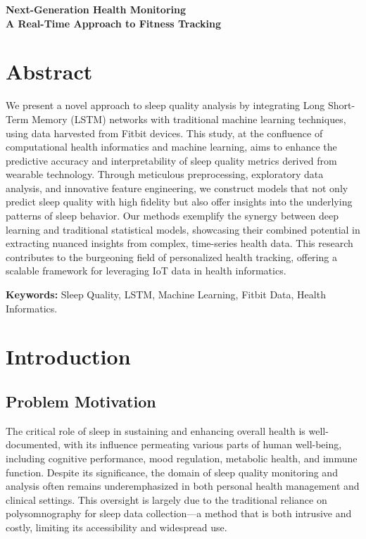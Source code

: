 \documentclass[10pt]{extarticle}
\begin{document}
\begin{center}
    {\LARGE \textbf{Next-Generation Health Monitoring}} \\
    {\large \textbf{A Real-Time Approach to Fitness Tracking}}
\end{center}

\section{Abstract}

We present a novel approach to sleep quality analysis by integrating Long Short-Term Memory (LSTM) networks with traditional machine learning techniques, using data harvested from Fitbit devices. This study, at the confluence of computational health informatics and machine learning, aims to enhance the predictive accuracy and interpretability of sleep quality metrics derived from wearable technology. Through meticulous preprocessing, exploratory data analysis, and innovative feature engineering, we construct models that not only predict sleep quality with high fidelity but also offer insights into the underlying patterns of sleep behavior. Our methods exemplify the synergy between deep learning and traditional statistical models, showcasing their combined potential in extracting nuanced insights from complex, time-series health data. This research contributes to the burgeoning field of personalized health tracking, offering a scalable framework for leveraging IoT data in health informatics.

\textbf{Keywords:} Sleep Quality, LSTM, Machine Learning, Fitbit Data, Health Informatics.

\section{Introduction}

\subsection{Problem Motivation}

The critical role of sleep in sustaining and enhancing overall health is well-documented, with its influence permeating various parts of human well-being, including cognitive performance, mood regulation, metabolic health, and immune function. Despite its significance, the domain of sleep quality monitoring and analysis often remains underemphasized in both personal health management and clinical settings. This oversight is largely due to the traditional reliance on polysomnography for sleep data collection---a method that is both intrusive and costly, limiting its accessibility and widespread use.
\end{document}
